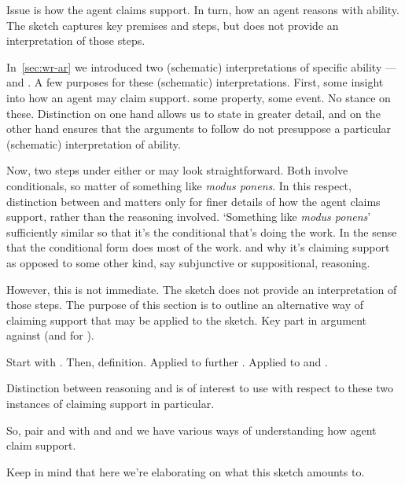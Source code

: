 \begin{note}
  Issue is how the agent claims support.
  In turn, how an agent reasons with ability.
  The sketch captures key premises and steps, but does not provide an interpretation of those steps.

  In~\autoref{sec:wr-ar} we introduced two (schematic) interpretations of specific ability --- \AR{} and \WR{}.
  A few purposes for these (schematic) interpretations.
  First, some insight into how an agent may claim support.
  \AR{} some property, \WR{} some event.
  No stance on these.
  Distinction on one hand allows us to state in greater detail, and on the other hand ensures that the arguments to follow do not presuppose a particular (schematic) interpretation of ability.

  Now, two steps under either \AR{} or \WR{} may look straightforward.
  Both involve conditionals, so matter of something like \emph{modus ponens}.
  In this respect, distinction between \AR{} and \WR{} matters only for finer details of how the agent claims support, rather than the reasoning involved.
  `Something like \emph{modus ponens}' sufficiently similar so that it's the conditional that's doing the work.
  In the sense that the conditional form does most of the work.
  \AR{} and \WR{} why it's claiming support as opposed to some other kind, say subjunctive or suppositional, reasoning.

  However, this is not immediate.
  The sketch does not provide an interpretation of those steps.
  The purpose of this section is to outline an alternative way of claiming support that may be applied to the sketch.
  Key part in argument against \ESU{} (and for \EAS{}).

  Start with .
  Then, definition.
  Applied to further .
  Applied to \AR{} and \WR{}.


  Distinction between reasoning \adA{} and \adB{} is of interest to use with respect to these two instances of claiming support in particular.

  So, pair \AR{} and \WR{} with \adA{} and \adB{} and we have various ways of understanding how agent claim support.

  Keep in mind that here we're elaborating on what this sketch amounts to.
\end{note}

